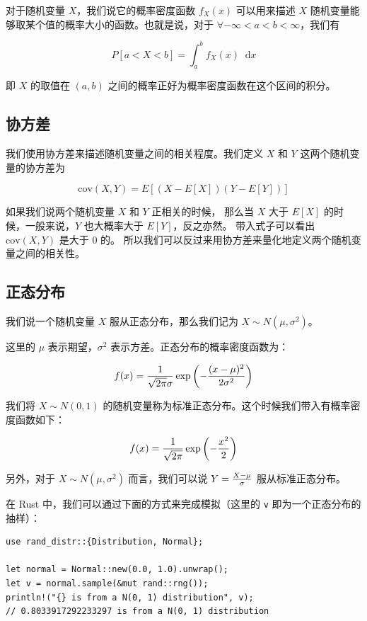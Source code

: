 \documentclass[utf8,a4paper,nofonts,9pt]{ctexbook}
\def\dif{\mathop{}\!\mathrm{d}}
\begin{document}
对于随机变量 $X$，我们说它的概率密度函数 $f_X(x)$ 可以用来描述 $X$ 随机变量能够取某个值的概率大小的函数。也就是说，对于 $\forall -\infty < a < b < \infty$，我们有

$$
P\left[ a < X < b \right] = \int_{a}^{b} f_X(x) \dif{x}
$$

即 $X$ 的取值在 $(a, b)$ 之间的概率正好为概率密度函数在这个区间的积分。

\subsection{协方差}

我们使用协方差来描述随机变量之间的相关程度。我们定义 $X$ 和 $Y$ 这两个随机变量的协方差为

$$
\textrm{cov}(X, Y) = E\left[ ( X - E[X] ) ( Y - E[Y] ) \right]
$$

如果我们说两个随机变量 $X$ 和 $Y$ 正相关的时候，
那么当 $X$ 大于 $E[X]$ 的时候，一般来说，$Y$ 也大概率大于 $E[Y]$，反之亦然。
带入式子可以看出 $\textrm{cov}(X, Y)$ 是大于 $0$ 的。
所以我们可以反过来用协方差来量化地定义两个随机变量之间的相关性。

\subsection{正态分布}

我们说一个随机变量 $X$ 服从正态分布，那么我们记为 $X \sim N(\mu, \sigma^2)$。

这里的 $\mu$ 表示期望，$\sigma^2$ 表示方差。正态分布的概率密度函数为：

$$
f(x) = {1 \over \sqrt{2\pi}\sigma} \exp\left(-{(x - \mu)^2 \over 2\sigma^2}\right)
$$

我们将 $X \sim N(0, 1)$ 的随机变量称为标准正态分布。这个时候我们带入有概率密度函数如下：

$$
f(x) = {1 \over \sqrt{2\pi}} \exp\left(-{x^2 \over 2}\right)
$$

另外，对于 $X \sim N(\mu, \sigma^2)$ 而言，我们可以说 $Y = {X - \mu \over \sigma}$ 服从标准正态分布。

在 Rust 中，我们可以通过下面的方式来完成模拟（这里的 \verb|v| 即为一个正态分布的抽样）：

\begin{lstlisting}
use rand_distr::{Distribution, Normal};

let normal = Normal::new(0.0, 1.0).unwrap();
let v = normal.sample(&mut rand::rng());
println!("{} is from a N(0, 1) distribution", v);
// 0.8033917292233297 is from a N(0, 1) distribution
\end{lstlisting}
\end{document}
